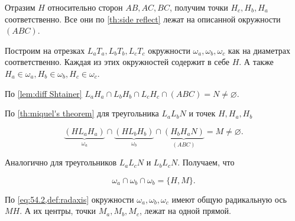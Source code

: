 \begin{enumerate}[resume*]
{            Отразим $H$ относительно сторон $AB, AC, BC$, получим точки $H_c, H_b, H_a$ соответственно. Все они по \cref{th:side reflect} лежат на описанной окружности $(ABC)$.

            Построим на отрезках $L_aT_a, L_bT_b, L_cT_c$ окружности $\omega_a, \omega_b, \omega_c$ как на диаметрах соответственно.
            Каждая из этих окружностей содержит в себе $H$. А также $H_a \in \omega_a, H_b \in \omega_b, H_c \in \omega_c$.

            По \cref{lem:diff Shtainer} $L_aH_a \cap L_bH_b \cap L_cH_c \cap (ABC) = N \neq \varnothing$.

            По \cref{th:miquel's theorem} для треугольника $L_aL_bN$ и точек $H, H_a, H_b$ 

            \begin{equation}
                \underbrace{(HL_aH_a)}_{\omega_a} \cap \underbrace{(HL_bH_b)}_{\omega_b} \cap \underbrace{(H_bH_aN)}_{(ABC)} = M \neq \varnothing.
            \end{equation}

            Аналогично для треугольников $L_aL_cN$ и $L_bL_cN$. Получаем, что 

            \begin{equation}\label{eq:54.2}
                \omega_a \cap \omega_b \cap \omega_b = \{H, M\}
            .\end{equation} 

            По \cref{eq:54.2,def:radaxis} окружности $\omega_a, \omega_b, \omega_c$ имеют общую радикальную ось $MH$. А их центры, точки $M_a, M_b, M_c$, лежат на одной прямой.
        }
    
\end{enumerate}
